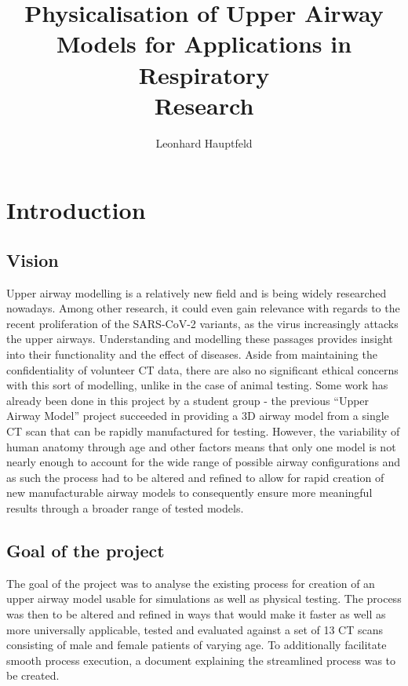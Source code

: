 \documentclass[MME,Projekt,english]{twbook}%
\title{Physicalisation of Upper Airway \\Models for Applications in Respiratory \\Research}
\author{Leonhard Hauptfeld}
\begin{document}
\maketitle

\chapter{Introduction}

\section{Vision}

Upper airway modelling is a relatively new field and is being widely researched nowadays. Among other research, it could even gain relevance with regards to the recent proliferation of the SARS-CoV-2 variants, as the virus increasingly attacks the upper airways\cite{omicronairways}. Understanding and modelling these passages provides insight into their functionality and the effect of diseases. Aside from maintaining the confidentiality of volunteer CT data, there are also no significant ethical concerns with this sort of modelling, unlike in the case of animal testing. Some work has already been done in this project by a student group - the previous “Upper Airway Model” project succeeded in providing a 3D airway model from a single CT scan that can be rapidly manufactured for testing. However, the variability of human anatomy through age and other factors means that only one model is not nearly enough to account for the wide range of possible airway configurations and as such the process had to be altered and refined to allow for rapid creation of new manufacturable airway models to consequently ensure more meaningful results through a broader range of tested models.

\section{Goal of the project}

The goal of the project was to analyse the existing process for creation of an upper airway model usable for simulations as well as physical testing. The process was then to be altered and refined in ways that would make it faster as well as more universally applicable, tested and evaluated against a set of 13 CT scans consisting of male and female patients of varying age. To additionally facilitate smooth process execution, a document explaining the streamlined process was to be created.
\end{document}
